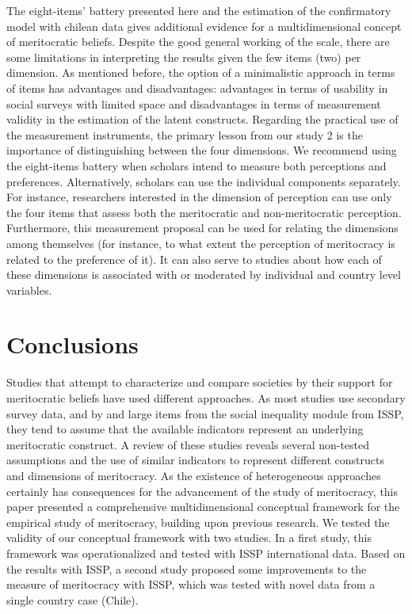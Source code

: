 \documentclass[
  10pt,
  a4paper,
]{article}
\begin{document}
The eight-items' battery presented here and the estimation of the confirmatory model with chilean data gives additional evidence for a multidimensional concept of meritocratic beliefs. Despite the good general working of the scale, there are some limitations in interpreting the results given the few items (two) per dimension. As mentioned before, the option of a minimalistic approach in terms of items has advantages and disadvantages: advantages in terms of usability in social surveys with limited space and disadvantages in terms of measurement validity in the estimation of the latent constructs. Regarding the practical use of the measurement instruments, the primary lesson from our study 2 is the importance of distinguishing between the four dimensions. We recommend using the eight-items battery when scholars intend to measure both perceptions and preferences. Alternatively, scholars can use the individual components separately. For instance, researchers interested in the dimension of perception can use only the four items that assess both the meritocratic and non-meritocratic perception. Furthermore, this measurement proposal can be used for relating the dimensions among themselves (for instance, to what extent the perception of meritocracy is related to the preference of it). It can also serve to studies about how each of these dimensions is associated with or moderated by individual and country level variables.

\section{Conclusions}\label{conclusions}

Studies that attempt to characterize and compare societies by their support for meritocratic beliefs have used different approaches. As most studies use secondary survey data, and by and large items from the social inequality module from ISSP, they tend to assume that the available indicators represent an underlying meritocratic construct. A review of these studies reveals several non-tested assumptions and the use of similar indicators to represent different constructs and dimensions of meritocracy. As the existence of heterogeneous approaches certainly has consequences for the advancement of the study of meritocracy, this paper presented a comprehensive multidimensional conceptual framework for the empirical study of meritocracy, building upon previous research. We tested the validity of our conceptual framework with two studies. In a first study, this framework was operationalized and tested with ISSP international data. Based on the results with ISSP, a second study proposed some improvements to the measure of meritocracy with ISSP, which was tested with novel data from a single country case (Chile).
\end{document}
